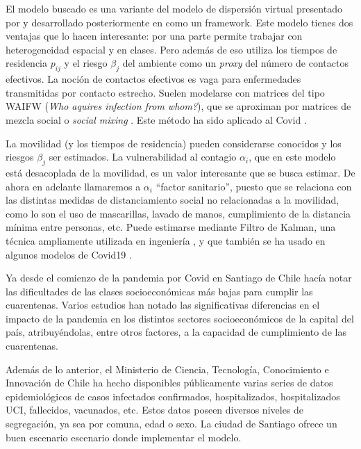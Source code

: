 \begin{intro}
El modelo buscado es una variante del modelo de dispersión virtual presentado por \cite{Bichara2015} y desarrollado posteriormente en \cite{Bichara2018} como un framework. Este modelo tienes dos ventajas que lo hacen interesante: por una parte permite trabajar con heterogeneidad espacial y en clases. Pero además de eso utiliza los tiempos de residencia \(p_{ij}\) y el riesgo \(\beta_j\) del ambiente como un \textit{proxy} del número de contactos efectivos. La noción de contactos efectivos es vaga para enfermedades transmitidas por contacto estrecho. Suelen modelarse con matrices del tipo WAIFW (\textit{Who aquires infection from whom?}), que se aproximan por matrices de mezcla social o \textit{social mixing} \cite{Mossong2008}. Este método ha sido aplicado al Covid \cite{Prem2020}. 

La movilidad (y los tiempos de residencia) pueden considerarse conocidos y los riesgos \(\beta_j\) ser estimados. La vulnerabilidad al contagio \(\alpha_i\), que en este modelo está desacoplada de la movilidad, es un valor interesante que se busca estimar. De ahora en adelante llamaremos a \(\alpha_i\) ``factor sanitario'', puesto que se relaciona con las distintas medidas de distanciamiento social no relacionadas a la movilidad, como lo son el uso de mascarillas, lavado de manos, cumplimiento de la distancia mínima entre personas, etc. Puede estimarse mediante Filtro de Kalman, una técnica ampliamente utilizada en ingeniería \cite{Auger2013}, y que también se ha usado en algunos modelos de Covid19 \cite{Hasan2020}\cite{Song2021}.

Ya desde el comienzo de la pandemia por Covid en Santiago de Chile \cite{Olivares2020} hacía notar las dificultades de las clases socioeconómicas más bajas para cumplir las cuarentenas.
Varios estudios \cite{Mena2021}\cite{Bennett2021}\cite{Gozzi2021} han notado las significativas diferencias en el impacto de la pandemia en los distintos sectores socioeconómicos de la capital del país, atribuyéndolas, entre otros factores, a la capacidad de cumplimiento de las cuarentenas. 

Además de lo anterior, el Ministerio de Ciencia, Tecnología, Conocimiento e Innovación de Chile ha hecho disponibles públicamente varias series de datos epidemiológicos de casos infectados confirmados, hospitalizados, hospitalizados UCI, fallecidos, vacunados, etc. Estos datos poseen diversos niveles de segregación, ya sea por comuna, edad o sexo. La ciudad de Santiago ofrece un buen escenario escenario donde implementar el modelo.


\end{intro}

